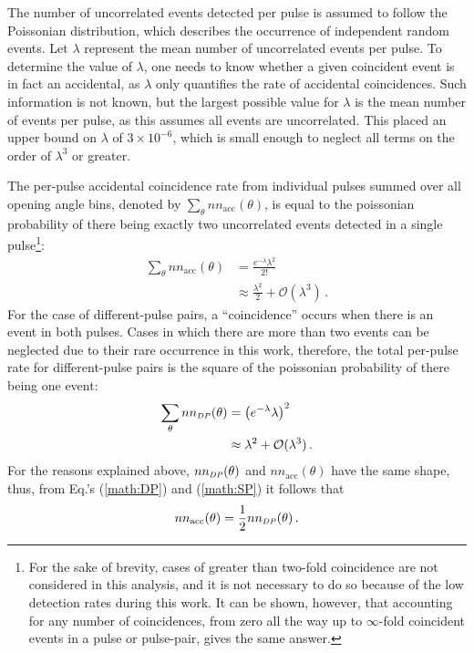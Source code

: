 The number of uncorrelated events detected per pulse is assumed to follow the Poissonian distribution, which describes the occurrence of independent random events.
Let $\lambda$ represent the mean number of uncorrelated events per pulse.
To determine the value of $\lambda$, one needs to know whether a given coincident event is in fact an accidental, as $\lambda$ only quantifies the rate of accidental coincidences.
Such information is not known, but the largest possible value for $\lambda$ is the mean number of events per pulse, as this assumes all events are uncorrelated.
This placed an upper bound on $\lambda$ of $3\times 10^{-6}$, which is small enough to neglect all terms on the order of $\lambda^3$ or greater.

The per-pulse accidental coincidence rate from individual pulses summed over all opening angle bins, denoted by $\sum_{\theta} nn_{\text{acc}}(\theta)$, is equal to the poissonian probability of there being exactly two uncorrelated events detected in a single pulse\footnote{For the sake of brevity, cases of greater than two-fold coincidence are not considered in this analysis, and it is not necessary to do so because of the low detection rates during this work.
It can be shown, however, that accounting for any number of coincidences, from zero all the way up to $\infty$-fold coincident events in a pulse or pulse-pair, gives the same answer.}:
\begin{equation} \label{math:SP}
    \begin{split}
    \sum_{\theta} nn_{\text{acc}}(\theta) & = \frac{e^{-\lambda}\lambda^{2}}{2!} \\
        &\approx \frac{\lambda^2}{{2}} + \mathcal{O}(\lambda^3) \, .
    \end{split}
\end{equation}
For the case of different-pulse pairs, a ``coincidence'' occurs when there is an event in both pulses.
Cases in which there are more than two events can be neglected due to their rare occurrence in this work, therefore, the total per-pulse rate for different-pulse pairs is the square of the poissonian probability of there being one event:
\begin{equation} \label{math:DP}
    \begin{split}
   \sum_{\theta} nn_{\scaleto{DP}{4pt}}(\theta)&= \left(e^{-\lambda}\lambda\right)^{2} \\
    &\approx \lambda^2 + \mathcal{O}(\lambda^3) \, .
    \end{split}
\end{equation}
For the reasons explained above, $nn_{\scaleto{DP}{4pt}}(\theta)$ and $nn_{\text{acc}}(\theta)$ have the same shape, thus, from Eq.'s (\ref{math:DP}) and (\ref{math:SP}) it follows that 
\begin{equation}
\label{eq:uncorr_DP}
nn_{\text{acc}}(\theta) = \frac{1}{2}nn_{\scaleto{DP}{4pt}}(\theta) \,.
\end{equation}

